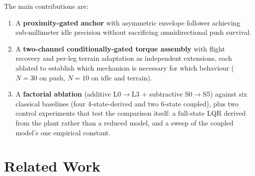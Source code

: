 \documentclass[conference]{IEEEtran}
\begin{document}
The main contributions are:
\begin{enumerate}
    \item A \textbf{proximity-gated anchor} with asymmetric envelope follower achieving sub-millimeter idle precision without sacrificing omnidirectional push survival.
    \item A \textbf{two-channel conditionally-gated torque assembly} with flight recovery and per-leg terrain adaptation as independent extensions, each ablated to establish which mechanism is necessary for which behaviour ($N{=}30$ on push, $N{=}10$ on idle and terrain).
    \item A \textbf{factorial ablation} (additive L0$\rightarrow$L3 $+$ subtractive S0$\rightarrow$S5) against six classical baselines (four 4-state-derived and two 6-state coupled), plus two control experiments that test the comparison itself: a full-state LQR derived from the plant rather than a reduced model, and a sweep of the coupled model's one empirical constant.
\end{enumerate}


\section{Related Work}
\end{document}
